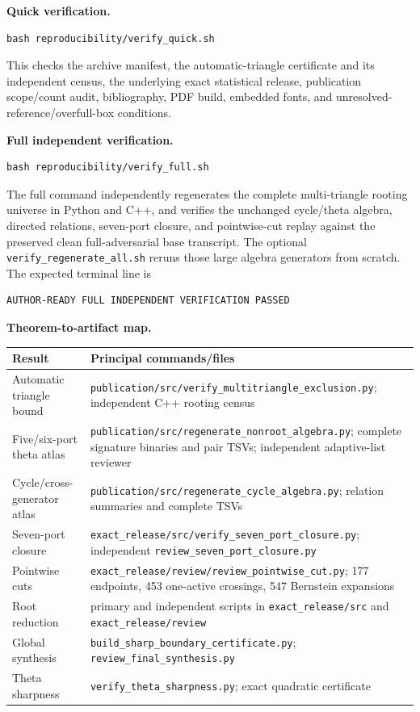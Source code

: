 \documentclass[10pt]{article}
\begin{document}
\textbf{Quick verification.}
\begin{verbatim}
bash reproducibility/verify_quick.sh
\end{verbatim}
This checks the archive manifest, the automatic-triangle certificate and its independent census, the underlying exact statistical release, publication scope/count audit, bibliography, PDF build, embedded fonts, and unresolved-reference/overfull-box conditions.

\newpage
\textbf{Full independent verification.}
\begin{verbatim}
bash reproducibility/verify_full.sh
\end{verbatim}
The full command independently regenerates the complete multi-triangle rooting universe in Python and C++, and verifies the unchanged cycle/theta algebra, directed relations, seven-port closure, and pointwise-cut replay against the preserved clean full-adversarial base transcript. The optional \texttt{verify\_regenerate\_all.sh} reruns those large algebra generators from scratch.  The expected terminal line is
\begin{verbatim}
AUTHOR-READY FULL INDEPENDENT VERIFICATION PASSED
\end{verbatim}

\textbf{Theorem-to-artifact map.}
\begin{center}\small
\begin{tabularx}{\textwidth}{@{}p{}X@{}}
\toprule
Result & Principal commands/files\\\midrule
Automatic triangle bound & \texttt{publication/src/verify\_multitriangle\_exclusion.py}; independent C++ rooting census\\
Five/six-port theta atlas & \texttt{publication/src/regenerate\_nonroot\_algebra.py}; complete signature binaries and pair TSVs; independent adaptive-list reviewer\\
Cycle/cross-generator atlas & \texttt{publication/src/regenerate\_cycle\_algebra.py}; relation summaries and complete TSVs\\
Seven-port closure & \texttt{exact\_release/src/verify\_seven\_port\_closure.py}; independent \texttt{review\_seven\_port\_closure.py}\\
Pointwise cuts & \texttt{exact\_release/review/review\_pointwise\_cut.py}; 177 endpoints, 453 one-active crossings, 547 Bernstein expansions\\
Root reduction & primary and independent scripts in \texttt{exact\_release/src} and \texttt{exact\_release/review}\\
Global synthesis & \texttt{build\_sharp\_boundary\_certificate.py}; \texttt{review\_final\_synthesis.py}\\
Theta sharpness & \texttt{verify\_theta\_sharpness.py}; exact quadratic certificate\\
\bottomrule
\end{tabularx}
\end{center}
\end{document}
